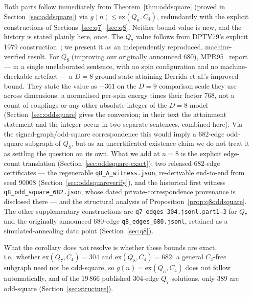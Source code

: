 \documentclass[12pt]{article}
\newcommand{\ex}{\mathrm{ex}}
\begin{document}
\noindent Both parts follow immediately from
Theorem~\ref{thm:oddsquare} (proved in Section~\ref{sec:oddsquare}) via
$g(n)\le\ex(Q_n,C_4)$, redundantly with the explicit constructions of
Sections~\ref{sec:q7}--\ref{sec:q8}. Neither bound value is new, and the
history is stated plainly here, once. The $Q_7$ value follows from
DPTV79's explicit 1979 construction~\cite{DPTV79}; we present it as an
independently reproduced, machine-verified result. For $Q_8$ (improving
our originally announced $680$), MPR95~\cite{MPR95} report --- in a
single unelaborated sentence, with no spin configuration and no
machine-checkable artefact --- a $D=8$ ground state attaining Derrida et
al.'s improved bound. They state the value as $-361$ on the $D{=}9$
comparison scale they use across dimensions: a normalised per-spin
energy times their factor $768$, not a count of couplings or any other
absolute integer of the $D{=}8$ model (Section~\ref{sec:oddsquare} gives
the conversion; in their text the attainment statement and the integer
occur in two separate sentences, combined here). Via the
signed-graph/odd-square correspondence this would imply a $682$-edge
odd-square subgraph of $Q_8$, but as an uncertificated existence claim we
do not treat it as settling the question on its own. What we add at
$n=8$ is the explicit edge-count translation
(Section~\ref{sec:oddsquare-exact}); two released $682$-edge
certificates --- the regenerable \texttt{q8\_A\_witness.json},
re-derivable end-to-end from seed $90008$
(Section~\ref{sec:oddsquareverify}), and the historical first witness
\texttt{q8\_odd\_square\_682.json}, whose dated private-correspondence
provenance is disclosed there --- and the structural analysis of
Proposition~\ref{prop:q8oddsquare}. The other supplementary
constructions are \texttt{q7\_edges\_304.jsonl.part1--3} for $Q_7$ and
the originally announced 680-edge \texttt{q8\_edges\_680.jsonl},
retained as a simulated-annealing data point (Section~\ref{sec:q8}).

What the corollary does \emph{not} resolve is whether these bounds are
exact, i.e.\
whether $\ex(Q_7,C_4)=304$ and $\ex(Q_8,C_4)=682$: a general
$C_4$-free subgraph need not be odd-square, so $g(n)=\ex(Q_n,C_4)$ does
not follow automatically, and of the $19\,866$
published 304-edge $Q_7$ solutions, only 389 are odd-square
(Section~\ref{sec:structure}).
\end{document}
